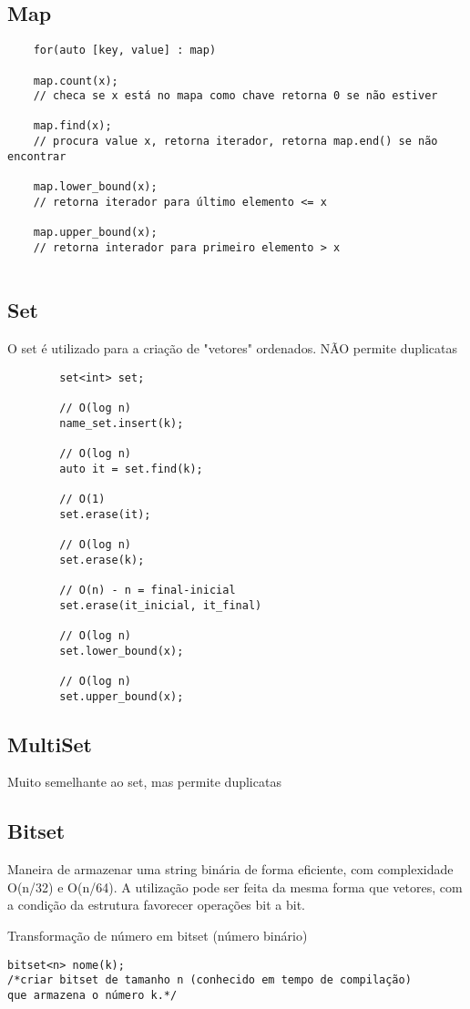 \subsection{Map}
\begin{verbatim}
    for(auto [key, value] : map)

    map.count(x);
    // checa se x está no mapa como chave retorna 0 se não estiver

    map.find(x);
    // procura value x, retorna iterador, retorna map.end() se não encontrar

    map.lower_bound(x);
    // retorna iterador para último elemento <= x

    map.upper_bound(x);
    // retorna interador para primeiro elemento > x
    

\end{verbatim}

\subsection{Set}    
    O set é utilizado para a criação de "vetores" ordenados. NÃO permite duplicatas
    \begin{verbatim}
        set<int> set; 

        // O(log n)
        name_set.insert(k);

        // O(log n)
        auto it = set.find(k);

        // O(1)
        set.erase(it);

        // O(log n)
        set.erase(k);

        // O(n) - n = final-inicial
        set.erase(it_inicial, it_final)
        
        // O(log n)
        set.lower_bound(x);

        // O(log n)
        set.upper_bound(x);
    \end{verbatim}

\subsection{MultiSet} 

Muito semelhante ao set, mas permite duplicatas

\subsection{Bitset}
    Maneira de armazenar uma string binária de forma eficiente, com complexidade O(n/32) e O(n/64). A utilização pode ser feita da mesma forma que vetores, com a condição da estrutura favorecer operações bit a bit.

    Transformação de número em bitset (número binário)
    \begin{verbatim}
bitset<n> nome(k); 
/*criar bitset de tamanho n (conhecido em tempo de compilação) 
que armazena o número k.*/
    \end{verbatim}

\pagebreak